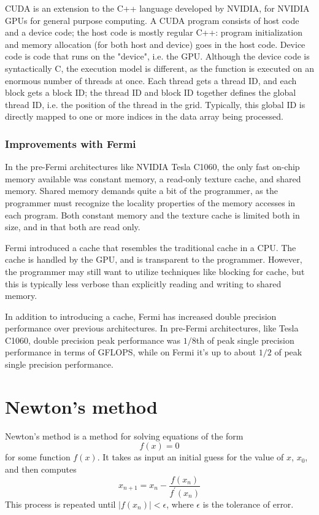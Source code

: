 CUDA is an extension to the C++ language developed by NVIDIA, for NVIDIA GPUs for general purpose computing. A CUDA program consists of host code and a device code; the host code is mostly regular C++: program initialization and memory allocation (for both host and device) goes in the host code. Device code is code that runs on the "device", i.e. the GPU. Although the device code is syntactically C, the execution model is different, as the function is executed on an enormous number of threads at once. Each thread gets a thread ID, and each block gets a block ID; the thread ID and block ID together defines the global thread ID, i.e. the position of the thread in the grid. Typically, this global ID is directly mapped to one or more indices in the data array being processed.

\subsubsection{Improvements with Fermi}
In the pre-Fermi architectures like NVIDIA Tesla C1060, the only fast on-chip memory available was constant memory, a read-only texture cache, and shared memory. Shared memory demands quite a bit of the programmer, as the programmer must recognize the locality properties of the memory accesses in each program. Both constant memory and the texture cache is limited both in size, and in that both are read only.

Fermi introduced a cache that resembles the traditional cache in a CPU. The cache is handled by the GPU, and is transparent to the programmer. However, the programmer may still want to utilize techniques like blocking for cache, but this is typically less verbose than explicitly reading and writing to shared memory. 

In addition to introducing a cache, Fermi has increased double precision performance over previous architectures.\cite[p. 9]{fermiwhitepaper} In pre-Fermi architectures, like Tesla C1060, double precision peak performance was $1/8$th of peak single precision performance in terms of GFLOPS, while on Fermi it's up to about $1/2$ of peak single precision performance.\cite[p. 9]{fermiwhitepaper}

\section{Newton's method}
\label{sec:newtons_method}
Newton's method is a method for solving equations of the form
$$
f(x) = 0
$$
for some function $f(x)$. It takes as input an initial guess for the value of $x$, $x_0$, and then computes
\begin{equation}
x_{n+1} = x_{n} - \frac{f(x_n)}{f^\prime(x_n)}
\end{equation}
This process is repeated until $|f(x_n)| < \epsilon$, where $\epsilon$ is the tolerance of error. 

